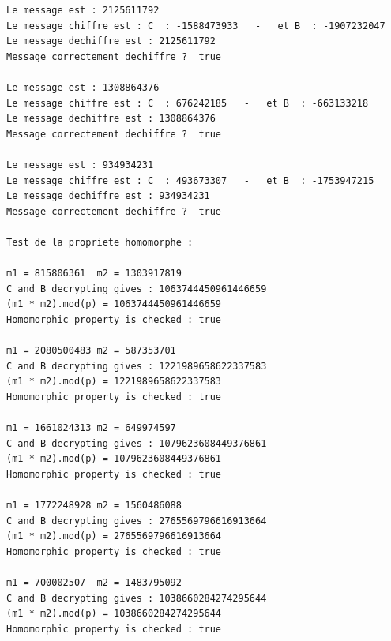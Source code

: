 \documentclass[a4paper,11pt]{article}
\begin{document}
\begin{lstlisting}[caption ={le fichier test.txt}, captionpos=b,breaklines = true]
Le message est : 2125611792
Le message chiffre est : C  : -1588473933   -   et B  : -1907232047
Le message dechiffre est : 2125611792
Message correctement dechiffre ?  true

Le message est : 1308864376
Le message chiffre est : C  : 676242185   -   et B  : -663133218
Le message dechiffre est : 1308864376
Message correctement dechiffre ?  true

Le message est : 934934231
Le message chiffre est : C  : 493673307   -   et B  : -1753947215
Le message dechiffre est : 934934231
Message correctement dechiffre ?  true

Test de la propriete homomorphe : 

m1 = 815806361	m2 = 1303917819
C and B decrypting gives : 1063744450961446659
(m1 * m2).mod(p) = 1063744450961446659
Homomorphic property is checked : true

m1 = 2080500483	m2 = 587353701
C and B decrypting gives : 1221989658622337583
(m1 * m2).mod(p) = 1221989658622337583
Homomorphic property is checked : true

m1 = 1661024313	m2 = 649974597
C and B decrypting gives : 1079623608449376861
(m1 * m2).mod(p) = 1079623608449376861
Homomorphic property is checked : true

m1 = 1772248928	m2 = 1560486088
C and B decrypting gives : 2765569796616913664
(m1 * m2).mod(p) = 2765569796616913664
Homomorphic property is checked : true

m1 = 700002507	m2 = 1483795092
C and B decrypting gives : 1038660284274295644
(m1 * m2).mod(p) = 1038660284274295644
Homomorphic property is checked : true

\end{lstlisting}
\end{document}
